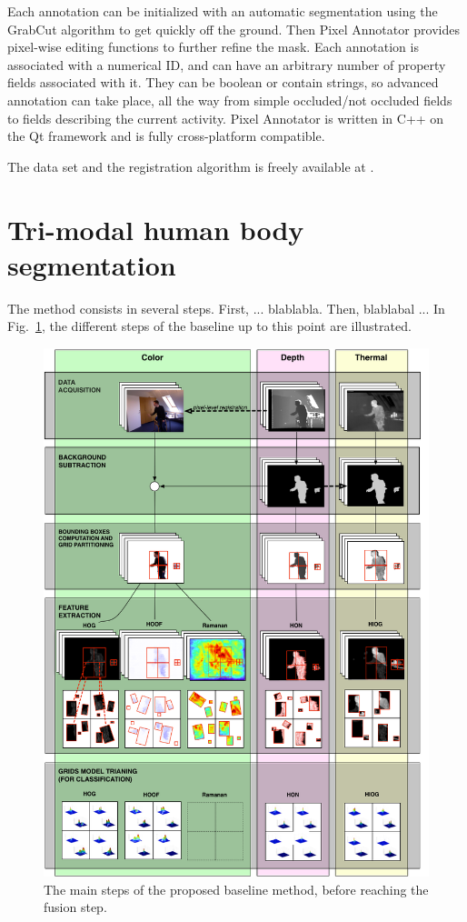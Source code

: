 \documentclass[10pt,twocolumn,letterpaper]{article}
\begin{document}
Each annotation can be initialized with an automatic segmentation using the GrabCut algorithm \cite{rother2004grabcut} to get quickly off the ground. Then Pixel Annotator provides pixel-wise editing functions to further refine the mask. Each annotation is associated with a numerical ID, and can have an arbitrary number of property fields associated with it. They can be boolean or contain strings, so advanced annotation can take place, all the way from simple occluded/not occluded fields to fields describing the current activity. Pixel Annotator is written in C++ on the Qt framework and is fully cross-platform compatible.

The data set and the registration algorithm is freely available at \cite{vapgroup}.


\section{Tri-modal human body segmentation}
\label{sec:trimodalhumanbodysegmentation}


The method consists in several steps. First, ... blablabla. Then, blablabal ... In Fig.~\ref{fig:baseline}, the different steps of the baseline up to this point are illustrated.

\begin{figure}[ht!]
	\centering
	\includegraphics[width=\linewidth]{pictures/diagram.png}
	\caption{The main steps of the proposed baseline method, before reaching the fusion step.}
	\label{fig:baseline}
\end{figure}
\end{document}
